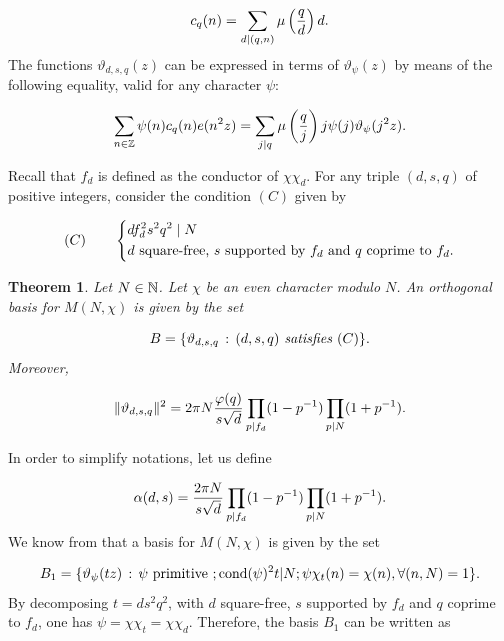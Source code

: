 \documentclass[leqno,10pt]{amsart}
\theoremstyle{plain}
\numberwithin{equation}{section}
\newtheorem{thm}{Theorem}[section]
\theoremstyle{definition}
\theoremstyle{remark}
\begin{document}
\begin{equation}\label{mod:eq:ram}
c_q(n)=\sum_{d\vert (q,n)} \mu\left(\frac{q}{d}\right) d.
\end{equation}
The functions $\vartheta_{d,s,q}(z)$ can be expressed in terms of $\vartheta_\psi(z)$ by means of the following equality, valid for any character $\psi$:

\begin{equation}\label{mod:eq:4}
\sum_{n\in\mathbb{Z}}\psi(n) c_q(n) e(n^2z) = \sum_{j\vert q} \mu\left(\frac{q}{j}\right) j \psi(j) \vartheta_\psi(j^2 z).
\end{equation}

Recall that $f_d$ is defined as the conductor of $\chi\chi_d$.
For any triple $(d,s,q)$ of positive integers, consider the condition $(C)$ given by

\begin{equation*}
(C) \qquad \left\{
\begin{aligned}
&d f_d^2 s^2 q^2 \mid N\\
&\textnormal{$d$ square-free, $s$ supported by $f_d$ and $q$ coprime to $f_d$}.
\end{aligned}\right.
\end{equation*}  

\begin{thm}\label{mod:thm}
Let $N\in \mathbb{N}$. Let $\chi$ be an even character modulo $N$. An orthogonal basis for $M(N,\chi)$ is given by the set 

\begin{equation*}
B= \{\vartheta_{d,s,q} \,:\, (d,s,q) \emph{ satisfies } (C)\}.
\end{equation*}
Moreover,

\begin{equation*}
\Vert \vartheta_{d,s,q} \Vert^2 
= 2 \pi N \frac{\varphi(q)}{s\sqrt{d}}  \prod_{p\vert f_d}(1-p^{-1}) \prod_{p\vert N}(1+p^{-1}).  
\end{equation*}
\end{thm}

\proof
In order to simplify notations, let us define

\begin{equation*}
\alpha(d,s) = \frac{2 \pi N}{s\sqrt{d}}  \prod_{p\vert f_d}(1-p^{-1}) \prod_{p\vert N}(1+p^{-1}).
\end{equation*}
We know from \cite[Theorem\,A]{ser-sta:theta} that a basis for $M(N,\chi)$ is given by the set 

\begin{equation*}
B_1=\{ \vartheta_\psi(tz)\,:\, \psi \textnormal{ primitive }; \textnormal{cond}(\psi)^2 t \vert N; \psi\chi_t (n)=\chi(n), \forall (n,N)=1\}.
\end{equation*} 
By decomposing $t=ds^2q^2$, with $d$ square-free, $s$ supported by $f_d$ and $q$ coprime to $f_d$, one has $\psi=\chi\chi_t=\chi\chi_d$. Therefore, the basis $B_1$ can be written as
\end{document}
